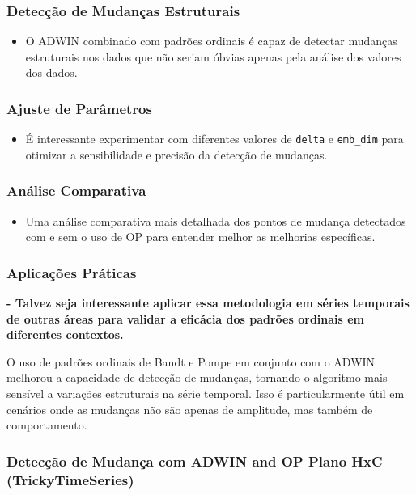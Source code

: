 \documentclass[
]{article}
\providecommand{\tightlist}{%
  \setlength{\itemsep}{0pt}\setlength{\parskip}{0pt}}
\begin{document}
\hypertarget{detecuxe7uxe3o-de-mudanuxe7as-estruturais}{%
\subsubsection{Detecção de Mudanças
Estruturais}\label{detecuxe7uxe3o-de-mudanuxe7as-estruturais}}

\begin{itemize}
\tightlist
\item
  O ADWIN combinado com padrões ordinais é capaz de detectar mudanças
  estruturais nos dados que não seriam óbvias apenas pela análise dos
  valores dos dados.
\end{itemize}

\hypertarget{ajuste-de-paruxe2metros}{%
\subsubsection{Ajuste de Parâmetros}\label{ajuste-de-paruxe2metros}}

\begin{itemize}
\tightlist
\item
  É interessante experimentar com diferentes valores de \texttt{delta} e
  \texttt{emb\_dim} para otimizar a sensibilidade e precisão da detecção
  de mudanças.
\end{itemize}

\hypertarget{anuxe1lise-comparativa}{%
\subsubsection{Análise Comparativa}\label{anuxe1lise-comparativa}}

\begin{itemize}
\tightlist
\item
  Uma análise comparativa mais detalhada dos pontos de mudança
  detectados com e sem o uso de OP para entender melhor as melhorias
  específicas.
\end{itemize}

\hypertarget{aplicauxe7uxf5es-pruxe1ticas}{%
\subsubsection{Aplicações Práticas}\label{aplicauxe7uxf5es-pruxe1ticas}}

\textbf{- Talvez seja interessante aplicar essa metodologia em séries
temporais de outras áreas para validar a eficácia dos padrões ordinais
em diferentes contextos.}

O uso de padrões ordinais de Bandt e Pompe em conjunto com o ADWIN
melhorou a capacidade de detecção de mudanças, tornando o algoritmo mais
sensível a variações estruturais na série temporal. Isso é
particularmente útil em cenários onde as mudanças não são apenas de
amplitude, mas também de comportamento.

\hypertarget{detecuxe7uxe3o-de-mudanuxe7a-com-adwin-and-op-plano-hxc-trickytimeseries}{%
\subsubsection{Detecção de Mudança com ADWIN and OP Plano HxC
(TrickyTimeSeries)}\label{detecuxe7uxe3o-de-mudanuxe7a-com-adwin-and-op-plano-hxc-trickytimeseries}}
\end{document}
